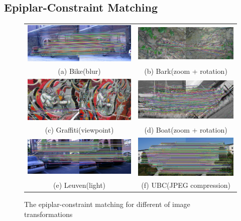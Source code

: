 \subsection {Epiplar-Constraint Matching}
\begin{figure}[H]
\begin{tabular}{cc}
  \includegraphics[width=75mm]{figures/bike_final_1_3} &  \includegraphics[width=75mm]{figures/barks_final_1_3} \\
(a) Bike(blur) & (b) Bark(zoom + rotation) \\[6pt]
 \includegraphics[width=75mm]{figures/graffiti_final_1_3} &  \includegraphics[width=75mm]{figures/boat_final_1_3} \\
(c) Graffiti(viewpoint) & (d) Boat(zoom + rotation) \\[6pt]
 \includegraphics[width=75mm]{figures/leuven_final_1_3} &  \includegraphics[width=75mm]{figures/ubc_final_1_3} \\
(e) Leuven(light) & (f) UBC(JPEG compression) \\[6pt]
\end{tabular}
\caption{The epiplar-constraint matching for different of image transformations}\label{fig:epipolar_matching}
\end{figure}

